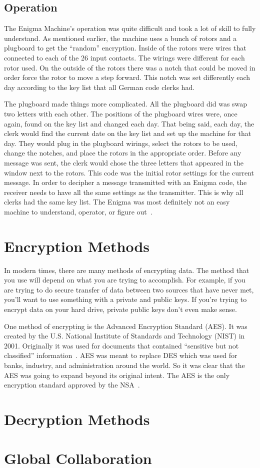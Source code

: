 \documentclass[12pt,a4paper,titlepage]{article}
\begin{document}
\subsection{Operation}
The Enigma Machine's operation was quite difficult and took a lot of skill to
fully understand. As mentioned earlier, the machine uses a bunch of rotors and a
plugboard to get the ``random'' encryption. Inside of the rotors were wires that
connected to each of the 26 input contacts. The wirings were different for each
rotor used. On the outside of the rotors there was a notch that could be moved
in order force the rotor to move a step forward. This notch was set differently
each day according to the key list that all German code clerks had.

The plugboard made things more complicated. All the plugboard did was swap two
letters with each other. The positions of the plugboard wires were, once again,
found on the key list and changed each day. That being said, each day, the
clerk would find the current date on the key list and set up the machine for
that day. They would plug in the plugboard wirings, select the rotors to be
used, change the notches, and place the rotors in the appropriate order. Before
any message was sent, the clerk would chose the three letters that appeared
in the window next to the rotors. This code was the initial rotor settings for
the current message. In order to decipher a message transmitted with an Enigma
code, the receiver needs to have all the same settings as the transmitter. This
is why all clerks had the same key list. The Enigma was most definitely not an
easy machine to understand, operator, or figure out~\cite{wilcox2006solving}.

\section{Encryption Methods}
In modern times, there are many methods of encrypting data. The method that you
use will depend on what you are trying to accomplish. For example, if you are 
trying to do secure transfer of data between two sources that have never met, 
you'll want to use something with a private and public keys. If you're trying 
to encrypt data on your hard drive, private public keys don't even make sense. 

One method of encrypting is the Advanced Encryption Standard (AES)\@. It was 
created by the U.S. National Institute of Standards and Technology (NIST) in 
2001. Originally it was used for documents that contained ``sensitive but not 
classified'' information~\cite{daemen2013design}. AES was meant to replace DES 
which was used for banks, industry, and administration around the world. So it 
was clear that the AES was going to expand beyond its original intent. The AES 
is the only encryption standard approved by the NSA~\cite{daemen2013design}.

\section{Decryption Methods}


\section{Global Collaboration}
\label{sec:global_collaboration}



\newpage

\appendix

\newpage
\printbibliography
\end{document}
